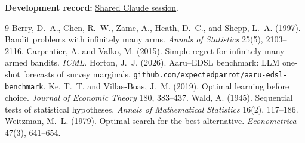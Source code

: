 \documentclass[10pt,twocolumn]{article}
\begin{document}
{\footnotesize
\noindent\textbf{Development record:} \href{https://claude.ai/share/92fb43e0-7c12-4c22-949c-a54802300e64}{Shared Claude session}.\par}

\begin{thebibliography}{9}
 Berry, D.~A., Chen, R.~W., Zame, A., Heath, D.~C., and Shepp, L.~A. (1997). Bandit problems with infinitely many arms. \emph{Annals of Statistics} 25(5), 2103--2116.
 Carpentier, A. and Valko, M. (2015). Simple regret for infinitely many armed bandits. \emph{ICML}.
 Horton, J.~J. (2026). Aaru--EDSL benchmark: LLM one-shot forecasts of survey marginals. \texttt{github.com/expectedparrot/aaru-edsl-benchmark}.
 Ke, T.~T. and Villas-Boas, J.~M. (2019). Optimal learning before choice. \emph{Journal of Economic Theory} 180, 383--437.
 Wald, A. (1945). Sequential tests of statistical hypotheses. \emph{Annals of Mathematical Statistics} 16(2), 117--186.
 Weitzman, M.~L. (1979). Optimal search for the best alternative. \emph{Econometrica} 47(3), 641--654.
\end{thebibliography}
\end{document}
